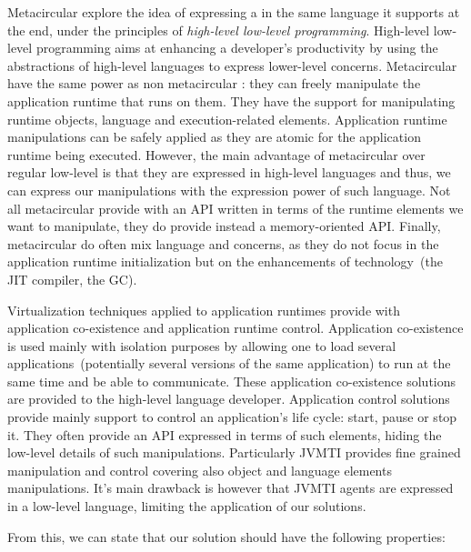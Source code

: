 Metacircular \VMs explore the idea of expressing a \VM in the same language it supports at the end, under the principles of \emph{high-level low-level programming}. High-level low-level programming aims at enhancing a developer's productivity by using the abstractions of high-level languages to express lower-level concerns. Metacircular \VMs have the same power as non metacircular \VMs: they can freely manipulate the application runtime that runs on them. They have the support for manipulating runtime objects, language and execution-related elements. Application runtime manipulations can be safely applied as they are atomic for the application runtime being executed. However, the main advantage of metacircular \VMs over regular low-level \VMs is that they are expressed in high-level languages and thus, we can express our manipulations with the expression power of such language. Not all metacircular \VMs provide with an API written in terms of the runtime elements we want to manipulate, they do provide instead a memory-oriented API. Finally, metacircular \VMs do often mix language and \VM concerns, as they do not focus in the application runtime initialization but on the enhancements of \VM technology~(\eg the JIT compiler, the GC).

Virtualization techniques applied to application runtimes provide with application co-existence and application runtime control. Application co-existence is used mainly with isolation purposes by allowing one to load several applications~(potentially several versions of the same application) to run at the same time and be able to communicate. These application co-existence solutions are provided to the high-level language developer. Application control solutions provide mainly support to control an application's life cycle: start, pause or stop it. They often provide an API expressed in terms of such elements, hiding the low-level details of such manipulations. Particularly JVMTI provides fine grained manipulation and control covering also object and language elements manipulations. It's main drawback is however that JVMTI agents are expressed in a low-level language, limiting the application of our solutions.

From this, we can state that our solution should have the following properties:

